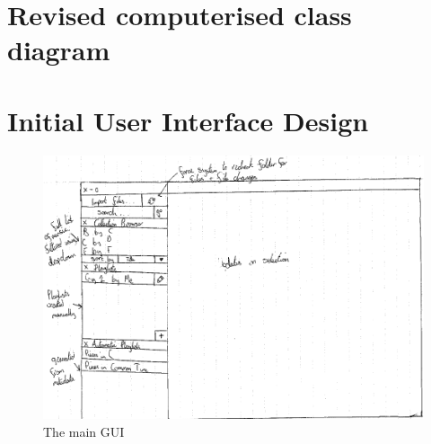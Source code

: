 \begin{appendices}
\section{Revised computerised class diagram}
\section{Initial User Interface Design}
\begin{figure}[h]
	\centering
	\includegraphics[width=400pt]{designs/main}
	\caption{The main GUI}
	\label{fig:m}	
\end{figure}


\end{appendices}

